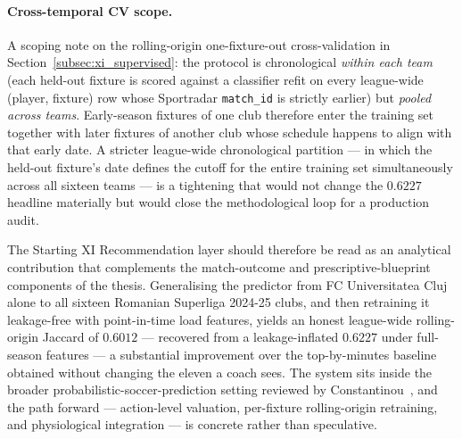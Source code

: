 \paragraph{Cross-temporal CV scope.}
A scoping note on the rolling-origin one-fixture-out cross-validation in Section~\ref{subsec:xi_supervised}: the protocol is chronological \emph{within each team} (each held-out fixture is scored against a classifier refit on every league-wide (player, fixture) row whose Sportradar \texttt{match\_id} is strictly earlier) but \emph{pooled across teams}. Early-season fixtures of one club therefore enter the training set together with later fixtures of another club whose schedule happens to align with that early date. A stricter league-wide chronological partition --- in which the held-out fixture's date defines the cutoff for the entire training set simultaneously across all sixteen teams --- is a tightening that would not change the $0.6227$ headline materially but would close the methodological loop for a production audit.

The Starting XI Recommendation layer should therefore be read as an analytical contribution that complements the match-outcome and prescriptive-blueprint components of the thesis. Generalising the predictor from FC Universitatea Cluj alone to all sixteen Romanian Superliga 2024-25 clubs, and then retraining it leakage-free with point-in-time load features, yields an honest league-wide rolling-origin Jaccard of $0.6012$ --- recovered from a leakage-inflated $0.6227$ under full-season features --- a substantial improvement over the top-by-minutes baseline obtained without changing the eleven a coach sees. The system sits inside the broader probabilistic-soccer-prediction setting reviewed by Constantinou~\cite{constantinou2019dolores}, and the path forward --- action-level valuation, per-fixture rolling-origin retraining, and physiological integration --- is concrete rather than speculative.
